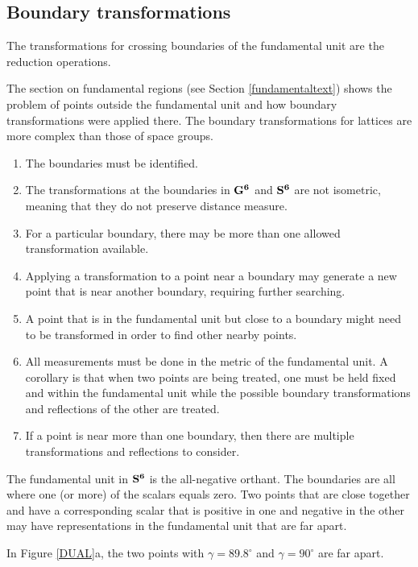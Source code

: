 \documentclass[preprint]{iucr}              %
\numberwithin{equation}{section}
\newcommand{\SVI}[0]{$\bf{S^{6}}$}
\newcommand{\GVI}[0]{$\bf{G^{6}}$}
\begin{document}
	
	\subsection{Boundary transformations}
	
	The transformations for crossing boundaries of the 
	fundamental unit are the reduction operations.
	
		The section on fundamental regions (see Section \ref{fundamentaltext}) shows the problem of points outside
	the fundamental unit and how boundary transformations were applied
	there. The boundary transformations for lattices are more complex
	than those of space groups. 
	
\begin{enumerate}
	\item  The boundaries must be identified.
	\item  The transformations at the boundaries in \GVI{} and
	 	\SVI{} are not isometric, meaning that they do not preserve
	 	distance measure.
	\item  For a particular boundary, there may be more than one
	 	allowed transformation available.
	\item  Applying a transformation to a point near a boundary may generate
	 	a new point that is near another boundary, requiring further
	 	searching.
	 \item A point that is in the fundamental unit but
	 close to a boundary might need to be transformed in order to
	 find other nearby points.
	 \item All measurements must be done in the metric of the
	 fundamental unit. A corollary is that when two points are
	 being treated, one must be held fixed and within the 
	 fundamental unit while the possible boundary transformations 
	 and reflections of the other are treated.
	 \item If a point is near more than one boundary,
	 then there are multiple transformations and reflections
	  to consider.
\end{enumerate}	

	The fundamental unit in \SVI{} is the all-negative orthant. The
	boundaries are all where one (or more) of the scalars equals zero.
	Two points that are close together and have a corresponding scalar that is positive 
	in one and negative in the other may have representations in 
	the fundamental unit that are far apart. 
	
	In Figure \ref{DUAL}a,
	the two points with $\gamma=89.8^{\circ}$  and $\gamma=90^{\circ}$ are far apart.
	
\end{document}
